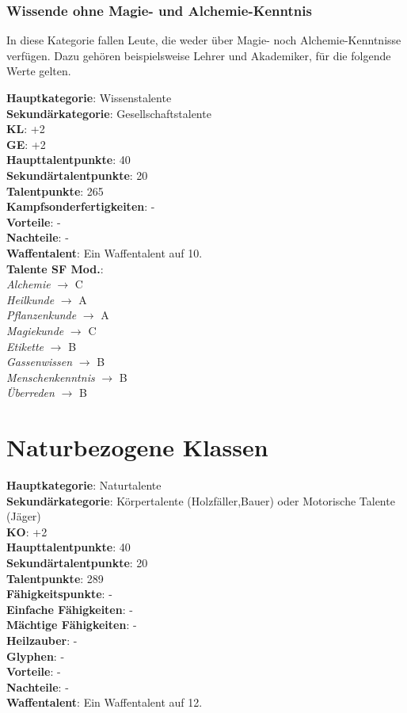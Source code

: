 \subsubsection{Wissende ohne Magie- und Alchemie-Kenntnis}
In diese Kategorie fallen Leute, die weder über Magie- noch Alchemie-Kenntnisse verfügen. Dazu gehören beispielsweise Lehrer und Akademiker, für die folgende Werte gelten.

\textbf{Hauptkategorie}: Wissenstalente \\
\textbf{Sekundärkategorie}: Gesellschaftstalente \\
\textbf{KL}: +2 \\
\textbf{GE}: +2 \\
\textbf{Haupttalentpunkte}: 40 \\
\textbf{Sekundärtalentpunkte}: 20 \\
\textbf{Talentpunkte}: 265 \\
\textbf{Kampfsonderfertigkeiten}: - \\
\textbf{Vorteile}: - \\
\textbf{Nachteile}: - \\
\textbf{Waffentalent}: Ein Waffentalent auf 10.\\
\textbf{Talente SF Mod.}: \\
\textit{Alchemie} $\rightarrow$ C \\
\textit{Heilkunde} $\rightarrow$ A \\
\textit{Pflanzenkunde} $\rightarrow$ A \\
\textit{Magiekunde} $\rightarrow$ C \\
\textit{Etikette} $\rightarrow$ B \\
\textit{Gassenwissen} $\rightarrow$ B \\
\textit{Menschenkenntnis} $\rightarrow$ B \\
\textit{Überreden} $\rightarrow$ B \\


\section{Naturbezogene Klassen}
\textbf{Hauptkategorie}: Naturtalente \\
\textbf{Sekundärkategorie}: Körpertalente (Holzfäller,Bauer) oder Motorische Talente (Jäger) \\
\textbf{KO}: +2 \\
\textbf{Haupttalentpunkte}: 40 \\
\textbf{Sekundärtalentpunkte}: 20 \\
\textbf{Talentpunkte}: 289 \\
\textbf{Fähigkeitspunkte}: - \\
\textbf{Einfache Fähigkeiten}: - \\
\textbf{Mächtige Fähigkeiten}: - \\
\textbf{Heilzauber}: - \\
\textbf{Glyphen}: - \\
\textbf{Vorteile}: - \\
\textbf{Nachteile}: - \\
\textbf{Waffentalent}: Ein Waffentalent auf 12.

